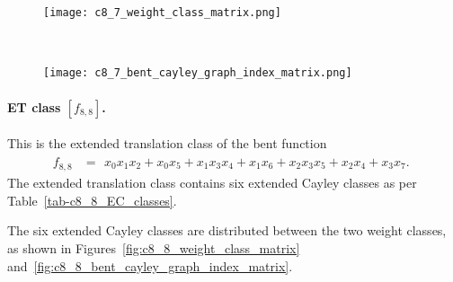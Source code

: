 \documentclass[12pt,a4paper]{article}
\begin{document}
\begin{figure}[!bhpt] %
\centering
\begin{minipage}{.48\textwidth}
  \centering
  \texttt{[image: c8\_7\_weight\_class\_matrix.png]}
  \label{fig:c8_7_weight_class_matrix}
\end{minipage}%
~~~~
\begin{minipage}{.48\textwidth}
  \centering
  \texttt{[image: c8\_7\_bent\_cayley\_graph\_index\_matrix.png]}
  \label{fig:c8_7_bent_cayley_graph_index_matrix}
\end{minipage}
\end{figure}

\newpage
\paragraph*{ET class $[f_{8,8}]$.}
%
This is the extended translation class of the bent function
\small{}
\begin{align*}
f_{ 8 , 8 } &=
\begin{array}{l}
x_{0} x_{1} x_{2} + x_{0} x_{5} + x_{1} x_{3} x_{4} + x_{1} x_{6} + x_{2} x_{3} x_{5} + x_{2} x_{4}
+ x_{3} x_{7}.
\end{array}
\end{align*}
\normalsize{}
The extended translation class contains six extended Cayley classes as per Table~\ref{tab-c8_8_EC_classes}.

The six extended Cayley classes are distributed between the two weight classes,
as shown in Figures~\ref{fig:c8_8_weight_class_matrix} and~\ref{fig:c8_8_bent_cayley_graph_index_matrix}.
\end{document}
